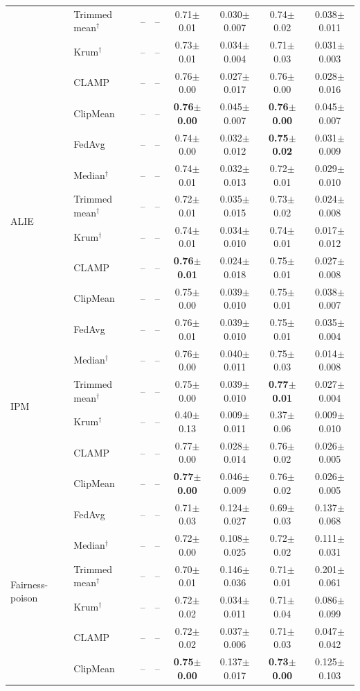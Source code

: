 \begin{table}[tbp]
\begin{tabular}{llcccccc}
 & Trimmed mean$^\dagger$ & -- & -- & 0.71$\pm$0.01 & 0.030$\pm$0.007 & 0.74$\pm$0.02 & 0.038$\pm$0.011 \\
 & Krum$^\dagger$ & -- & -- & 0.73$\pm$0.01 & 0.034$\pm$0.004 & 0.71$\pm$0.03 & 0.031$\pm$0.003 \\
 & CLAMP & -- & -- & 0.76$\pm$0.00 & 0.027$\pm$0.017 & 0.76$\pm$0.00 & 0.028$\pm$0.016 \\
 & ClipMean & -- & -- & \textbf{0.76$\pm$0.00} & 0.045$\pm$0.007 & \textbf{0.76$\pm$0.00} & 0.045$\pm$0.007 \\
\midrule
\multirow{6}{*}{ALIE} & FedAvg & -- & -- & 0.74$\pm$0.00 & 0.032$\pm$0.012 & \textbf{0.75$\pm$0.02} & 0.031$\pm$0.009 \\
 & Median$^\dagger$ & -- & -- & 0.74$\pm$0.01 & 0.032$\pm$0.013 & 0.72$\pm$0.01 & 0.029$\pm$0.010 \\
 & Trimmed mean$^\dagger$ & -- & -- & 0.72$\pm$0.01 & 0.035$\pm$0.015 & 0.73$\pm$0.02 & 0.024$\pm$0.008 \\
 & Krum$^\dagger$ & -- & -- & 0.74$\pm$0.01 & 0.034$\pm$0.010 & 0.74$\pm$0.01 & 0.017$\pm$0.012 \\
 & CLAMP & -- & -- & \textbf{0.76$\pm$0.01} & 0.024$\pm$0.018 & 0.75$\pm$0.01 & 0.027$\pm$0.008 \\
 & ClipMean & -- & -- & 0.75$\pm$0.00 & 0.039$\pm$0.010 & 0.75$\pm$0.01 & 0.038$\pm$0.007 \\
\midrule
\multirow{6}{*}{IPM} & FedAvg & -- & -- & 0.76$\pm$0.01 & 0.039$\pm$0.010 & 0.75$\pm$0.01 & 0.035$\pm$0.004 \\
 & Median$^\dagger$ & -- & -- & 0.76$\pm$0.00 & 0.040$\pm$0.011 & 0.75$\pm$0.03 & 0.014$\pm$0.008 \\
 & Trimmed mean$^\dagger$ & -- & -- & 0.75$\pm$0.00 & 0.039$\pm$0.010 & \textbf{0.77$\pm$0.01} & 0.027$\pm$0.004 \\
 & Krum$^\dagger$ & -- & -- & 0.40$\pm$0.13 & 0.009$\pm$0.011 & 0.37$\pm$0.06 & 0.009$\pm$0.010 \\
 & CLAMP & -- & -- & 0.77$\pm$0.00 & 0.028$\pm$0.014 & 0.76$\pm$0.02 & 0.026$\pm$0.005 \\
 & ClipMean & -- & -- & \textbf{0.77$\pm$0.00} & 0.046$\pm$0.009 & 0.76$\pm$0.02 & 0.026$\pm$0.005 \\
\midrule
\multirow{6}{*}{Fairness-poison} & FedAvg & -- & -- & 0.71$\pm$0.03 & 0.124$\pm$0.027 & 0.69$\pm$0.03 & 0.137$\pm$0.068 \\
 & Median$^\dagger$ & -- & -- & 0.72$\pm$0.00 & 0.108$\pm$0.025 & 0.72$\pm$0.02 & 0.111$\pm$0.031 \\
 & Trimmed mean$^\dagger$ & -- & -- & 0.70$\pm$0.01 & 0.146$\pm$0.036 & 0.71$\pm$0.01 & 0.201$\pm$0.061 \\
 & Krum$^\dagger$ & -- & -- & 0.72$\pm$0.02 & 0.034$\pm$0.011 & 0.71$\pm$0.04 & 0.086$\pm$0.099 \\
 & CLAMP & -- & -- & 0.72$\pm$0.02 & 0.037$\pm$0.006 & 0.71$\pm$0.03 & 0.047$\pm$0.042 \\
 & ClipMean & -- & -- & \textbf{0.75$\pm$0.00} & 0.137$\pm$0.017 & \textbf{0.73$\pm$0.00} & 0.125$\pm$0.103 \\
\bottomrule
\end{tabular}
\end{table}

